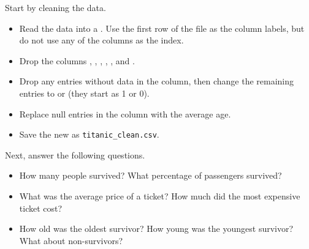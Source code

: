 Start by cleaning the data.
\begin{itemize}
    \item Read the data into a .
    Use the first row of the file as the column labels, but do not use any of the columns as the index.
    \item Drop the columns , , , , , and .
    \item Drop any entries without data in the  column, then change the remaining entries to  or  (they start as 1 or 0).
    \item Replace null entries in the  column with the average age.
    \item Save the new  as \texttt{titanic\_clean.csv}.
\end{itemize}
Next, answer the following questions.
\begin{itemize}
    \item How many people survived? What percentage of passengers survived?
    \item What was the average price of a ticket? How much did the most expensive ticket cost?
    \item How old was the oldest survivor? How young was the youngest survivor? What about non-survivors?
\end{itemize}



